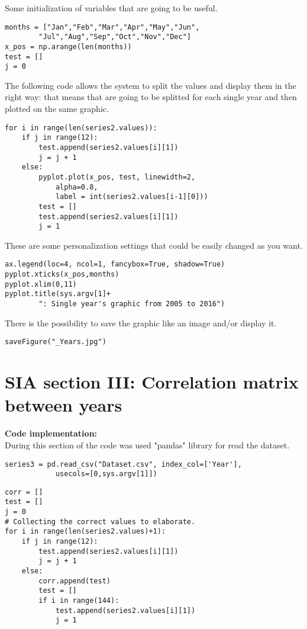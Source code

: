Some initialization of variables that are going to be useful.
\begin{lstlisting}
months = ["Jan","Feb","Mar","Apr","May","Jun",
		"Jul","Aug","Sep","Oct","Nov","Dec"]
x_pos = np.arange(len(months))
test = []
j = 0
\end{lstlisting}

The following code allows the system to split the values and display them in the right way: that means that are going to be splitted for each single year and then plotted on the same graphic.
\begin{lstlisting}
for i in range(len(series2.values)):
	if j in range(12):
		test.append(series2.values[i][1])
		j = j + 1
	else:
		pyplot.plot(x_pos, test, linewidth=2, 
			alpha=0.8, 
			label = int(series2.values[i-1][0]))
		test = []
		test.append(series2.values[i][1])
		j = 1

\end{lstlisting}

These are some personalization settings that could be easily changed as you want.
\begin{lstlisting}
ax.legend(loc=4, ncol=1, fancybox=True, shadow=True)
pyplot.xticks(x_pos,months)
pyplot.xlim(0,11)
pyplot.title(sys.argv[1]+ 
		": Single year's graphic from 2005 to 2016")
\end{lstlisting}

There is the possibility to save the graphic like an image and/or display it.
\begin{lstlisting}
saveFigure("_Years.jpg")
\end{lstlisting}


\section{SIA section III: Correlation matrix between years}
\label{SIA_section_III}
\textbf{Code implementation:}\\
During this section of the code was used "pandas" library for read the dataset.
\begin{lstlisting}
series3 = pd.read_csv("Dataset.csv", index_col=['Year'],
			usecols=[0,sys.argv[1]])
\end{lstlisting}

\begin{lstlisting}
corr = []
test = []
j = 0
# Collecting the correct values to elaborate.
for i in range(len(series2.values)+1):
	if j in range(12):
		test.append(series2.values[i][1])
		j = j + 1
	else:
		corr.append(test)
		test = []
		if i in range(144):
			test.append(series2.values[i][1])
			j = 1
\end{lstlisting}

